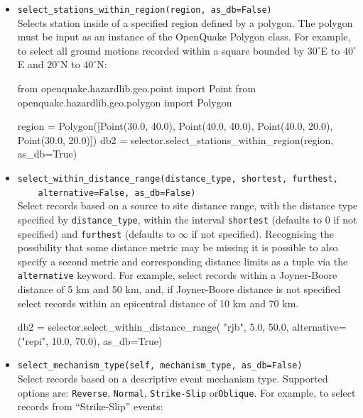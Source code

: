\begin{itemize}
\item \verb;select_stations_within_region(region, as_db=False);\\

Selects station inside of a specified region defined by a polygon. The polygon must be input as an instance of the OpenQuake Polygon class. For example, to select all ground motions recorded within a square bounded by $30^{\circ}$E to $40^{\circ}$E and $20^{\circ}$N to $40^{\circ}$N:

\begin{python}
from openquake.hazardlib.geo.point import Point
from openquake.hazardlib.geo.polygon import Polygon

region = Polygon([Point(30.0, 40.0),
                  Point(40.0, 40.0),
                  Point(40.0, 20.0),
                  Point(30.0, 20.0)])
db2 = selector.select_stations_within_region(region,
                                             as_db=True)
\end{python}

\item \verb;select_within_distance_range(distance_type, shortest, furthest,;\\
\verb;    alternative=False, as_db=False);\\
Select records based on a source to site distance range, with the distance type specified by \verb=distance_type=, within the interval \verb=shortest= (defaults to 0 if not specified) and \verb=furthest= (defaults to $\infty$ if not specified). Recognising the possibility that some distance metric may be missing it is possible to also specify a second metric and corresponding distance limits as a tuple via the
\verb=alternative= keyword. For example, select records within a Joyner-Boore distance of 5 km and 50 km, and, if Joyner-Boore distance is not specified select records within an epicentral distance of 10 km and 70 km.

\begin{python}
db2 = selector.select_within_distance_range(
    "rjb", 5.0, 50.0,
    alternative=("repi", 10.0, 70.0),
    as_db=True) 
\end{python}

\item \verb;select_mechanism_type(self, mechanism_type, as_db=False);\\
Select records based on a descriptive event mechanism type. Supported options are: \verb=Reverse=, \verb=Normal=, \verb=Strike-Slip= or\verb=Oblique=.  For example, to select records from ``Strike-Slip'' events:


\end{itemize}
